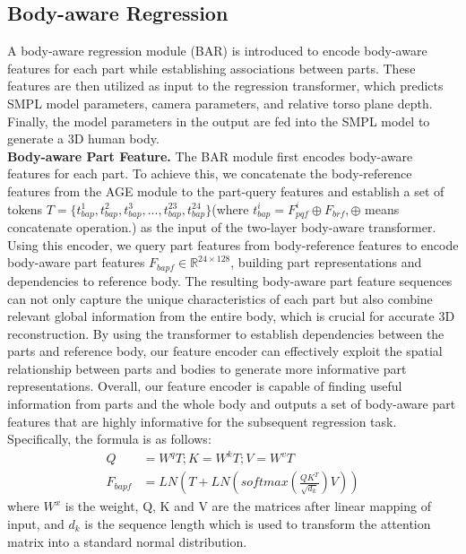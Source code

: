 \documentclass[10pt,twocolumn,letterpaper]{article}
\begin{document}
\subsection{Body-aware Regression}
A body-aware regression module (BAR) is introduced to encode body-aware features for each part while establishing associations between parts. These features are then utilized as input to the regression transformer, which predicts SMPL model parameters, camera parameters, and relative torso plane depth. Finally, the model parameters in the output are fed into the SMPL model to generate a 3D human body.
 \\
\noindent\textbf{Body-aware Part Feature.}
The BAR module first encodes body-aware features for each part. To achieve this, we concatenate the body-reference features from the AGE module to the part-query features and establish a set of tokens $T=\{t^{1}_{bap},t^{2}_{bap},t^{3}_{bap},...,t^{23}_{bap},t^{24}_{bap} \}$(where $t^{i}_{bap}=F^{i}_{pqf}\oplus F_{brf},\oplus$ means concatenate operation.) as the input of the two-layer body-aware transformer. Using this encoder, we query part features from body-reference features to encode body-aware part features $F_{bapf}\in \mathbb{R}^{24\times 128}$, building part representations and dependencies to reference body. The resulting body-aware part feature sequences can  not only capture the unique characteristics of each part but also combine relevant global information from the entire body, which is crucial for accurate 3D reconstruction. By using the transformer to establish dependencies between the parts and reference body, our feature encoder can effectively exploit the spatial relationship between parts and bodies to generate more informative part representations. Overall, our feature encoder is capable of finding useful information from parts and the whole body and outputs a set of body-aware part features that are highly informative for the subsequent regression task. Specifically, the formula is as follows:
\begin{equation}
\begin{aligned}
  Q &=W^{q}T;K=W^{k}T;V=W^{v}T \\
  F_{bapf} &=LN(T+LN(softmax(\frac{QK^{T}}{\sqrt{d_{k}}})V))
\end{aligned}
\end{equation}
where $W^{x}$ is the weight, Q, K and V are the matrices after linear mapping of input, and $d_{k}$ is the sequence length which is used to transform the attention matrix into a standard normal distribution.
\end{document}
